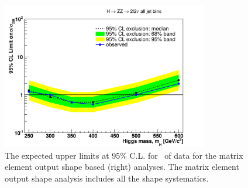 

\begin{figure}[!htbp]
\begin{center}
   \includegraphics[width=0.8\textwidth]{figures/limits_meshape_5fb.pdf}
   \caption{ The expected upper limits at 95\% C.L. for \intlumi\ of data for the matrix element output shape based (right) analyses. 
	The matrix element output shape analysis includes all the shape systematics. }
   \label{fig:limits_meshape_5fb}
\end{center}
\end{figure}

